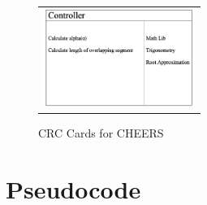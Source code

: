 \documentclass{report}
\begin{document}
\begin{figure}[h!]
      \begin{tabular}{@{}c@{}}
        \includegraphics[width=.4\linewidth,height=90pt]{resources/Controller.png}
      \end{tabular}

      \vspace{\floatsep}
    \caption{CRC Cards for CHEERS}\label{fig:myfig}
\end{figure}

\chapter{Pseudocode}
\end{document}
